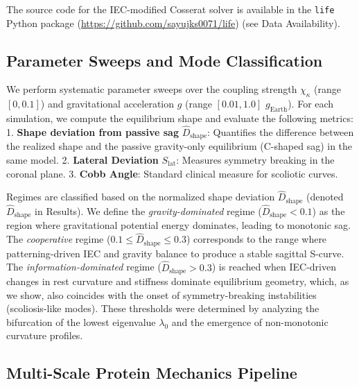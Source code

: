 \documentclass[11pt]{article}
\newcommand{\Dgeohat}{\widehat{D}_{\mathrm{shape}}}
\begin{document}
The source code for the IEC-modified Cosserat solver is available in the \texttt{life} Python package (\url{https://github.com/sayujks0071/life}) (see Data Availability).

\subsection{Parameter Sweeps and Mode Classification}

We perform systematic parameter sweeps over the coupling strength $\chi_\kappa$ (range $[0, 0.1]$) and gravitational acceleration $g$ (range $[0.01, 1.0]$ $g_{\mathrm{Earth}}$). For each simulation, we compute the equilibrium shape and evaluate the following metrics:
1.  \textbf{Shape deviation from passive sag} $\widehat{D}_{\mathrm{shape}}$: Quantifies the difference between the realized shape and the passive gravity-only equilibrium (C-shaped sag) in the same model.
2.  \textbf{Lateral Deviation} $S_{\mathrm{lat}}$: Measures symmetry breaking in the coronal plane.
3.  \textbf{Cobb Angle}: Standard clinical measure for scoliotic curves.

Regimes are classified based on the normalized shape deviation $\widehat{D}_{\mathrm{shape}}$ (denoted $\Dgeohat$ in Results). We define the \emph{gravity-dominated} regime ($\widehat{D}_{\mathrm{shape}} < 0.1$) as the region where gravitational potential energy dominates, leading to monotonic sag. The \emph{cooperative} regime ($0.1 \leq \widehat{D}_{\mathrm{shape}} \leq 0.3$) corresponds to the range where patterning-driven IEC and gravity balance to produce a stable sagittal S-curve. The \emph{information-dominated} regime ($\widehat{D}_{\mathrm{shape}} > 0.3$) is reached when IEC-driven changes in rest curvature and stiffness dominate equilibrium geometry, which, as we show, also coincides with the onset of symmetry-breaking instabilities (scoliosis-like modes). These thresholds were determined by analyzing the bifurcation of the lowest eigenvalue $\lambda_0$ and the emergence of non-monotonic curvature profiles.

\subsection{Multi-Scale Protein Mechanics Pipeline}
\end{document}
